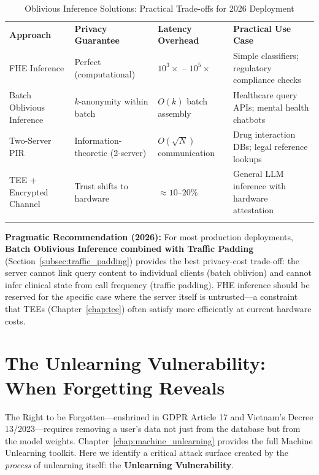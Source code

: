 \begin{table}[ht]
\centering
\caption{Oblivious Inference Solutions: Practical Trade-offs for 2026 Deployment}
\label{tab:oblivious_inference}
\begin{tabular}{p{3.5cm} p{3.0cm} p{2.5cm} p{3.0cm}}
\hline\noalign{\smallskip}
\textbf{Approach} & \textbf{Privacy Guarantee} & \textbf{Latency Overhead} & \textbf{Practical Use Case} \\
\noalign{\smallskip}\svhline\noalign{\smallskip}
FHE Inference & Perfect (computational) & $10^3\times$ -- $10^5\times$ & Simple classifiers; regulatory compliance checks \\[4pt]
Batch Oblivious Inference & $k$-anonymity within batch & $O(k)$ batch assembly & Healthcare query APIs; mental health chatbots \\[4pt]
Two-Server PIR & Information-theoretic (2-server) & $O(\sqrt{N})$ communication & Drug interaction DBs; legal reference lookups \\[4pt]
TEE + Encrypted Channel & Trust shifts to hardware & $\approx 10$--$20$\% & General LLM inference with hardware attestation \\
\noalign{\smallskip}\hline\noalign{\smallskip}
\end{tabular}
\end{table}

\begin{svgraybox}
\textbf{Pragmatic Recommendation (2026):} For most production deployments, \textbf{Batch Oblivious Inference combined with Traffic Padding} (Section~\ref{subsec:traffic_padding}) provides the best privacy-cost trade-off: the server cannot link query content to individual clients (batch oblivion) and cannot infer clinical state from call frequency (traffic padding). FHE inference should be reserved for the specific case where the server itself is untrusted---a constraint that TEEs (Chapter~\ref{chap:tee}) often satisfy more efficiently at current hardware costs.
\end{svgraybox}

\section{The Unlearning Vulnerability: When Forgetting Reveals}
\label{sec:unlearning_vulnerability}

The Right to be Forgotten---enshrined in GDPR Article 17 and Vietnam's Decree 13/2023---requires removing a user's data not just from the database but from the model weights. Chapter~\ref{chap:machine_unlearning} provides the full Machine Unlearning toolkit. Here we identify a critical attack surface created by the \emph{process} of unlearning itself: the \textbf{Unlearning Vulnerability}.

